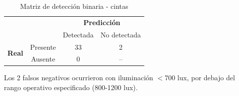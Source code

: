 \begin{table}[H]
\centering
\begin{tabular}{cc|c|c|}
\cline{3-4}
& & \multicolumn{2}{c|}{\textbf{Predicción}} \\ \cline{3-4}
& & Detectada & No detectada \\ \hline
\multicolumn{1}{|c|}{\multirow{2}{*}{\textbf{Real}}} & Presente & 33 & 2 \\ \cline{2-4}
\multicolumn{1}{|c|}{} & Ausente & 0 & -- \\ \hline
\end{tabular}
\caption{Matriz de detección binaria - cintas}
\label{tab:confusion_cintas}
\end{table}

\noindent
Los 2 falsos negativos ocurrieron con iluminación $<$700 lux, por debajo del rango operativo especificado (800-1200 lux).
